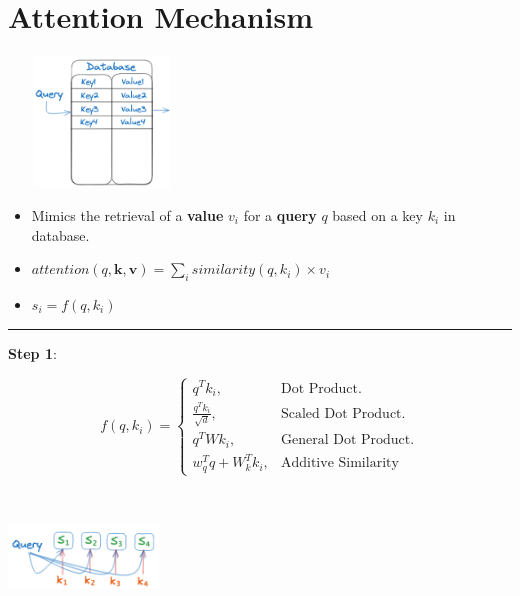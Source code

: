 \documentclass{article}
\begin{document}
\section{Attention Mechanism}
\begin{minipage}{0.5\textwidth}
\includegraphics[width=5cm, height=3.5cm]{Transformer/Images/Attention1.png}
\end{minipage}
\begin{minipage}{0.5\textwidth}
\begin{itemize}
    \item Mimics the retrieval of a \textbf{value} $v_i$ for a \textbf{query} $q$ based on a key $k_i$ in database.
    \item $attention(q,\textbf{k},\textbf{v}) = \sum_i similarity(q,k_i)\times v_i$
    \item $s_i = f(q,k_i)$
\end{itemize}
\end{minipage}
\hrule
\textbf{Step 1}: \\
\begin{minipage}{.65\linewidth}
\begin{equation*}
  f(q,k_i)=\begin{cases}
    q^T k_i, & \text{Dot Product}.\\
    \frac{q^T k_i}{\sqrt{d}}, & \text{Scaled Dot Product}.\\
    q^T W k_i, & \text{General Dot Product}. \\
    w_q^T q + W_k^T k_i , & \text{Additive Similarity}
  \end{cases}
\end{equation*}
\end{minipage}
\begin{minipage}{.5\linewidth}
\includegraphics[width=4cm, height=3.5cm]{Transformer/Images/Attention2.png}
\end{minipage}
\end{document}
